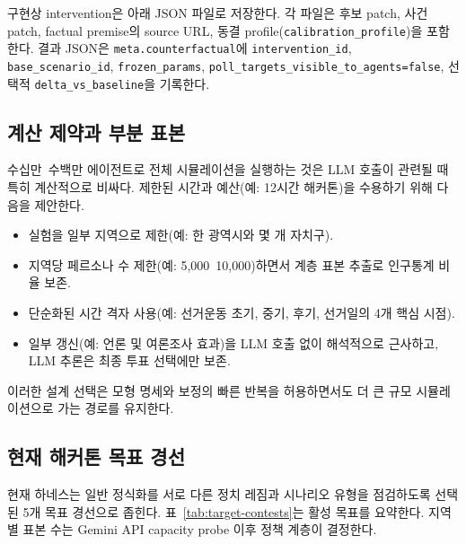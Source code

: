 \documentclass[11pt]{article}
\begin{document}
구현상 intervention은  아래 JSON 파일로 저장한다. 각 파일은 후보 patch, 사건 patch, factual premise의 source URL, 동결 profile(\texttt{calibration\_profile})을 포함한다. 결과 JSON은 \texttt{meta.counterfactual}에 \texttt{intervention\_id}, \texttt{base\_scenario\_id}, \texttt{frozen\_params}, \texttt{poll\_targets\_visible\_to\_agents=false}, 선택적 \texttt{delta\_vs\_baseline}을 기록한다.

\subsection{계산 제약과 부분 표본}

수십만~수백만 에이전트로 전체 시뮬레이션을 실행하는 것은 LLM 호출이 관련될 때 특히 계산적으로 비싸다. 제한된 시간과 예산(예: 12시간 해커톤)을 수용하기 위해 다음을 제안한다.

\begin{itemize}
  \item 실험을 일부 지역으로 제한(예: 한 광역시와 몇 개 자치구).
  \item 지역당 페르소나 수 제한(예: 5,000~10,000)하면서 계층 표본 추출로 인구통계 비율 보존.
  \item 단순화된 시간 격자 사용(예: 선거운동 초기, 중기, 후기, 선거일의 4개 핵심 시점).
  \item 일부 갱신(예: 언론 및 여론조사 효과)을 LLM 호출 없이 해석적으로 근사하고, LLM 추론은 최종 투표 선택에만 보존.
\end{itemize}

이러한 설계 선택은 모형 명세와 보정의 빠른 반복을 허용하면서도 더 큰 규모 시뮬레이션으로 가는 경로를 유지한다.

\subsection{현재 해커톤 목표 경선}

현재 하네스는 일반 정식화를 서로 다른 정치 레짐과 시나리오 유형을 점검하도록 선택된 5개 목표 경선으로 좁힌다. 표~\ref{tab:target-contests}는 활성 목표를 요약한다. 지역별 표본 수는 Gemini API capacity probe 이후 정책 계층이 결정한다.
\end{document}

